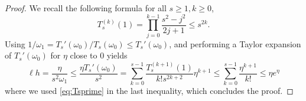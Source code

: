 \documentclass[10pt,a4paper]{amsart}
\begin{document}
\begin{proof}
We recall the following formula for all $s\geq 1,k\geq 0$,
\begin{equation} \label{eq:Tsprime}
T_s^{(k)}(1) = \prod_{j=0}^{k-1} \frac{s^2-j^2}{2j+1} \leq s^{2k}.
\end{equation} 
Using $1/\omega_1 = T_s'(\omega_0)/T_s(\omega_0)\leq T_s'(\omega_0)$, and performing a Taylor expansion of $T_s'(\omega_0)$ for $\eta$ close to 
$0$ yields
$$
\ell h=\frac{\eta}{s^2\omega_1} \leq \frac{\eta T_s'(\omega_0)}{s^2}
=\sum_{k=0}^{s-1} \frac{T_s^{(k+1)}(1)}{k! s^{2k+2} }{\eta^{k+1}} \leq 
\sum_{k=0}^{s-1} \frac{\eta^{k+1}}{k!} \leq \eta e^\eta
$$
where we used \eqref{eq:Tsprime} in the last inequality, which concludes the proof. 
\end{proof}
\end{document}
